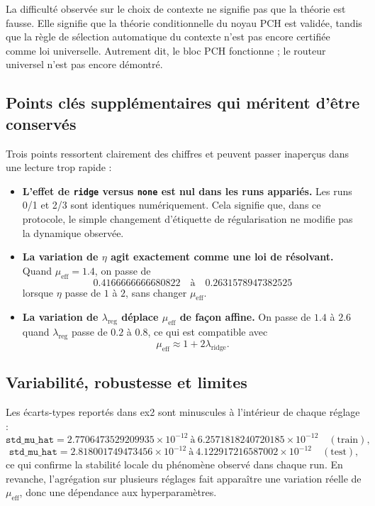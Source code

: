 La difficulté observée sur le choix de contexte ne signifie pas que la théorie est fausse. Elle signifie que la théorie conditionnelle du noyau PCH est validée, tandis que la règle de sélection automatique du contexte n’est pas encore certifiée comme loi universelle. Autrement dit, le bloc PCH fonctionne ; le routeur universel n’est pas encore démontré.

\subsection{Points clés supplémentaires qui méritent d’être conservés}

Trois points ressortent clairement des chiffres et peuvent passer inaperçus dans une lecture trop rapide :

\begin{itemize}
    \item \textbf{L’effet de \texttt{ridge} versus \texttt{none} est nul dans les runs appariés.}
    Les runs 0/1 et 2/3 sont identiques numériquement.
    Cela signifie que, dans ce protocole, le simple changement d’étiquette de régularisation ne modifie pas la dynamique observée.

    \item \textbf{La variation de \(\eta\) agit exactement comme une loi de résolvant.}
    Quand \(\mu_{\mathrm{eff}}=1.4\), on passe de
    \[
    0.4166666666680822 \quad \text{à} \quad 0.2631578947382525
    \]
    lorsque \(\eta\) passe de \(1\) à \(2\), sans changer \(\mu_{\mathrm{eff}}\).

    \item \textbf{La variation de \(\lambda_{\mathrm{reg}}\) déplace \(\mu_{\mathrm{eff}}\) de façon affine.}
    On passe de \(1.4\) à \(2.6\) quand \(\lambda_{\mathrm{reg}}\) passe de \(0.2\) à \(0.8\), ce qui est compatible avec
    \[
    \mu_{\mathrm{eff}} \approx 1 + 2\lambda_{\mathrm{ridge}}.
    \]
\end{itemize}

\subsection{Variabilité, robustesse et limites}

Les écarts-types reportés dans ex2 sont minuscules à l’intérieur de chaque réglage :
\[
\texttt{std\_mu\_hat}=2.7706473529209935\times 10^{-12}\ \text{à}\ 6.2571818240720185\times 10^{-12}\quad(\text{train}),
\]
\[
\texttt{std\_mu\_hat}=2.818001749473456\times 10^{-12}\ \text{à}\ 4.122917216587002\times 10^{-12}\quad(\text{test}),
\]
ce qui confirme la stabilité locale du phénomène observé dans chaque run. En revanche, l’agrégation sur plusieurs réglages fait apparaître une variation réelle de \(\mu_{\mathrm{eff}}\), donc une dépendance aux hyperparamètres.

